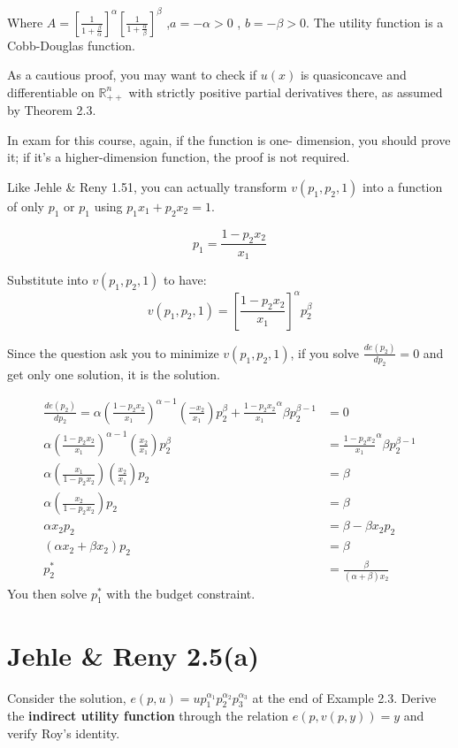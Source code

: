 \documentclass{article}
\newcommand{\R}{\mathbb{R}}
\begin{document}
Where $A = [\frac{1}{1+ \frac{\beta}{\alpha}}]^\alpha[\frac{1}{1+ \frac{\alpha}{\beta}}]^\beta$ ,$a = -\alpha >0$ , $b= -\beta > 0$. The utility function is a Cobb-Douglas function.


\begin{mdframed}[backgroundcolor=yellow!20,linecolor=white]
As a cautious proof, you may want to check if $u(x)$ is quasiconcave and differentiable on $\R^n_{++}$ with strictly positive partial derivatives there, as assumed by Theorem 2.3. 

In exam for this course, again, if the function is one- dimension, you should prove it; if it's a higher-dimension function, the proof is not required.
\end{mdframed}

\begin{mdframed}[backgroundcolor=blue!20,linecolor=white]
Like Jehle \& Reny 1.51, you can actually transform $v(p_1,p_2,1)$  into a function of only $p_1$ or $p_1$ using $p_1x_1 + p_2x_2 = 1$.

$$p_1 = \frac{1 - p_2x_2}{x_1}$$

Substitute into  $v(p_1,p_2,1)$ to have:
$$v(p_1,p_2,1) = [\frac{1 - p_2x_2}{x_1}]^\alpha p_2^\beta$$

Since the question ask you to minimize $v(p_1,p_2,1)$, if you solve $\frac{d e(p_2)}{d p_2} = 0$ and get only one solution, it is the solution.

\begin{align*}
\frac{d e(p_2)}{d p_2} =  \alpha(\frac{1-p_2x_2}{x_1})^{\alpha -1}(\frac{-x_2}{x_1})p_2^\beta +  \frac{1 - p_2x_2}{x_1}^\alpha \beta p_2^{\beta -1} &= 0 \\
 \alpha(\frac{1-p_2x_2}{x_1})^{\alpha -1}(\frac{x_2}{x_1})p_2^\beta &= \frac{1 - p_2x_2}{x_1}^\alpha \beta p_2^{\beta -1} \\
 \alpha(\frac{x_1}{1-p_2x_2})(\frac{x_2}{x_1})p_2 &= \beta  \\
\alpha(\frac{x_2}{1-p_2x_2}) p_2 &= \beta  \\
\alpha x_2 p_2 &= \beta-\beta x_2 p_2  \\
(\alpha x_2 + \beta x_2) p_2&= \beta  \\
 p^*_2&= \frac{\beta}{(\alpha + \beta)x_2} 
\end{align*}
You then solve $p^*_1$ with the budget constraint.
\end{mdframed}

\section{Jehle \& Reny 2.5(a)}
Consider the solution, $e(p, u) = up_1^{\alpha_1}p_2^{\alpha_2}p_3^{\alpha_3}$ at the end of Example 2.3.
Derive the \textbf{indirect utility function} through the relation $e(p, v(p, y)) = y$ and verify Roy's identity.
\end{document}
